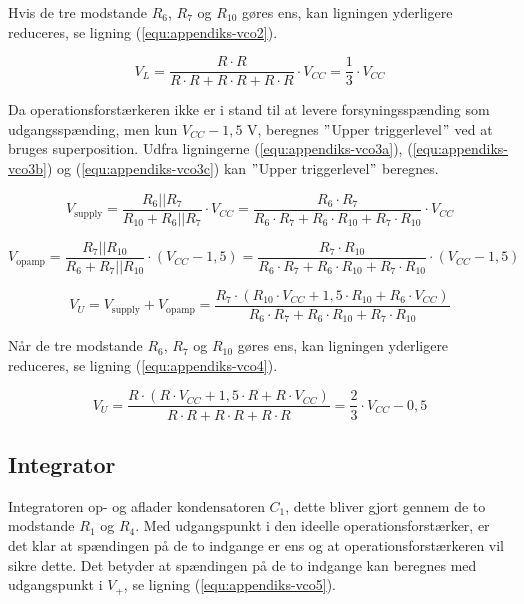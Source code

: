 Hvis de tre modstande $R_6$, $R_7$ og $R_{10}$ gøres ens, kan ligningen yderligere reduceres, se ligning (\ref{equ:appendiks-vco2}).

\begin{equation}
\label{equ:appendiks-vco2}
V_L = \frac{R \cdot R}{R \cdot R + R \cdot R + R \cdot R} \cdot V_{CC} = \frac{1}{3} \cdot V_{CC}
\end{equation}

Da operationsforstærkeren ikke er i stand til at levere forsyningsspænding som udgangsspænding, men kun $V_{CC} - 1,5$ V, beregnes $"$Upper triggerlevel$"$ ved at bruges superposition. Udfra ligningerne (\ref{equ:appendiks-vco3a}), (\ref{equ:appendiks-vco3b}) og (\ref{equ:appendiks-vco3c}) kan $"$Upper triggerlevel$"$ beregnes.

\begin{equation}
\label{equ:appendiks-vco3a}
V_{\mathrm{supply}} = \frac{R_6||R_7}{R_{10} + R_6||R_7} \cdot V_{CC} = \frac{R_6 \cdot R_7}{R_6 \cdot R_7 + R_6 \cdot R_{10} + R_7 \cdot R_{10}} \cdot V_{CC}
\end{equation}

\begin{equation}
\label{equ:appendiks-vco3b}
V_{\mathrm{opamp}} = \frac{R_7||R_{10}}{R_6 + R_7||R_{10}} \cdot (V_{CC} - 1,5) = \frac{R_7 \cdot R_{10}}{R_6 \cdot R_7 + R_6 \cdot R_{10} + R_7 \cdot R_{10}} \cdot (V_{CC} - 1,5)
\end{equation}

\begin{equation}
\label{equ:appendiks-vco3c}
V_U = V_{\mathrm{supply}} + V_{\mathrm{opamp}} = \frac{R_7 \cdot (R_{10} \cdot V_{CC} + 1,5 \cdot R_{10} + R_6 \cdot V_{CC})}{R_6 \cdot R_7 + R_6 \cdot R_{10} + R_7 \cdot R_{10}}
\end{equation}

Når de tre modstande $R_6$, $R_7$ og $R_{10}$ gøres ens, kan ligningen yderligere reduceres, se ligning (\ref{equ:appendiks-vco4}).

\begin{equation}
\label{equ:appendiks-vco4}
V_U = \frac{R \cdot (R \cdot V_{CC} + 1,5 \cdot R + R \cdot V_{CC})}{R \cdot R + R \cdot R + R \cdot R} = \frac{2}{3} \cdot V_{CC} - 0,5
\end{equation}

\subsection*{Integrator}
Integratoren op- og aflader kondensatoren $C_1$, dette bliver gjort gennem de to modstande $R_1$ og $R_4$. Med udgangspunkt i den ideelle operationsforstærker, er det klar at spændingen på de to indgange er ens og at operationsforstærkeren vil sikre dette. Det betyder at spændingen på de to indgange kan beregnes med udgangspunkt i $V_+$, se ligning (\ref{equ:appendiks-vco5}).

